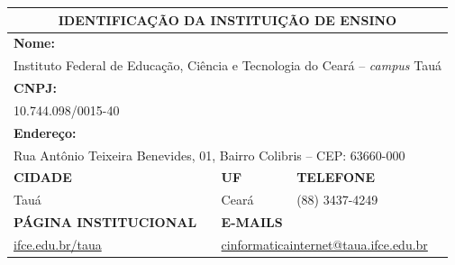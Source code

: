 \documentclass[
	12pt,				%
	openright,			%
	twoside,			%
	a4paper,			%
	chapter=TITLE,		%
	english,			%
	french,				%
	spanish,			%
	brazil,				%
	]{abntex2}
\begin{document}
\small
\noindent
\begin{tabularx}{\linewidth}{X X X X }
    
    \multicolumn{4}{c}{\textbf{IDENTIFICAÇÃO DA INSTITUIÇÃO DE ENSINO}} \\
    \toprule
    \multicolumn{4}{l}{\cellcolor{gray!20}\textbf{Nome:}} \\
    \multicolumn{4}{l}{Instituto Federal de Educação, Ciência e Tecnologia do Ceará -- \textit{campus} Tauá} \\
    
    \multicolumn{4}{l}{\cellcolor{gray!20}\textbf{CNPJ:}} \\
    \multicolumn{4}{l}{10.744.098/0015-40} \\
    
    \multicolumn{4}{l}{\cellcolor{gray!20}\textbf{Endere\c{c}o:}} \\
    \multicolumn{4}{l}{Rua Antônio Teixeira Benevides, 01, Bairro Colibris -- CEP: 63660-000} \\
    
    
     
    \multicolumn{2}{l}{\cellcolor{gray!20}\textbf{CIDADE}} & \cellcolor{gray!20} \textbf{UF} & \cellcolor{gray!20} \textbf{TELEFONE} \\
     
    \multicolumn{2}{l}{Tauá} & Ceará & (88) 3437-4249\\

     \multicolumn{2}{l}{\cellcolor{gray!20}\textbf{PÁGINA INSTITUCIONAL}} &
     \multicolumn{2}{l}{\cellcolor{gray!20}\textbf{E-MAILS}} \\
     
     \multicolumn{2}{l}{\href{http://ifce.edu.br/taua}{ifce.edu.br/taua}} &
     \multicolumn{2}{l}{\href{mailto:cinformaticainternet@taua.ifce.edu.br}{cinformaticainternet@taua.ifce.edu.br}} \\
     
     \bottomrule
     
\end{tabularx}
\vspace{2em}
\noindent
\end{document}
